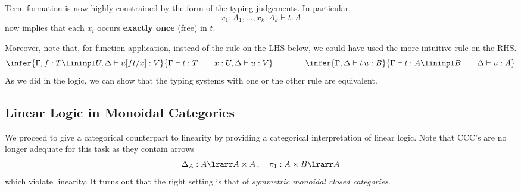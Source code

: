 \documentclass{svmult}
\begin{document}
\noindent
Term formation is now highly constrained by the form of the typing judgements. In particular,
\[ x_1 : A_1 , \ldots , x_k : A_k \vdash t : A \]
now implies that each $x_i$ occurs \textbf{exactly once} (free) in $t$.

Moreover, note that, for function application, instead of the rule on the LHS
below, we could have used the more intuitive rule on the RHS.
\[ \infer{\Gamma,f:T\linimpl U,\Delta\vdash u[ft/x]:V}{\Gamma\vdash t:T\qquad x:U,\Delta\vdash u:V} \qquad\qquad
\infer{\Gamma,\Delta\vdash t\,u:B}{\Gamma\vdash t:A\linimpl B \qquad \Delta\vdash u:A}
\]
As we did in the logic, we can show that the typing systems with one or the other rule are equivalent.

\subsection{Linear Logic in Monoidal Categories}
We proceed to give a categorical counterpart to linearity by providing a categorical interpretation of linear logic.
Note that CCC's are no longer adequate for this task as they contain arrows
\[ \Delta_A:A\lrarr A\times A\,,\quad \pi_1:A\times B\lrarr A \]
which violate linearity. It turns out that the right setting is that of \emph{symmetric monoidal closed
categories}.
\end{document}
